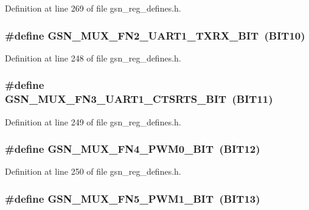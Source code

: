 Definition at line 269 of file gsn\_\-reg\_\-defines.h.

\hypertarget{a00546_a4031432d667ab0771290bfb647eaf11c}{
\subsubsection[{GSN\_\-MUX\_\-FN2\_\-UART1\_\-TXRX\_\-BIT}]{\setlength{\rightskip}{0pt plus 5cm}\#define GSN\_\-MUX\_\-FN2\_\-UART1\_\-TXRX\_\-BIT~(BIT10)}}
\label{a00546_a4031432d667ab0771290bfb647eaf11c}


Definition at line 248 of file gsn\_\-reg\_\-defines.h.

\hypertarget{a00546_aeb849952d1631fe0556a334f67e36077}{
\subsubsection[{GSN\_\-MUX\_\-FN3\_\-UART1\_\-CTSRTS\_\-BIT}]{\setlength{\rightskip}{0pt plus 5cm}\#define GSN\_\-MUX\_\-FN3\_\-UART1\_\-CTSRTS\_\-BIT~(BIT11)}}
\label{a00546_aeb849952d1631fe0556a334f67e36077}


Definition at line 249 of file gsn\_\-reg\_\-defines.h.

\hypertarget{a00546_a7f4b2abe933a45381f428ad2bc5cc728}{
\subsubsection[{GSN\_\-MUX\_\-FN4\_\-PWM0\_\-BIT}]{\setlength{\rightskip}{0pt plus 5cm}\#define GSN\_\-MUX\_\-FN4\_\-PWM0\_\-BIT~(BIT12)}}
\label{a00546_a7f4b2abe933a45381f428ad2bc5cc728}


Definition at line 250 of file gsn\_\-reg\_\-defines.h.

\hypertarget{a00546_af23c44efdd7e700be60fb4a3c9fdf25e}{
\subsubsection[{GSN\_\-MUX\_\-FN5\_\-PWM1\_\-BIT}]{\setlength{\rightskip}{0pt plus 5cm}\#define GSN\_\-MUX\_\-FN5\_\-PWM1\_\-BIT~(BIT13)}}
\label{a00546_af23c44efdd7e700be60fb4a3c9fdf25e}


